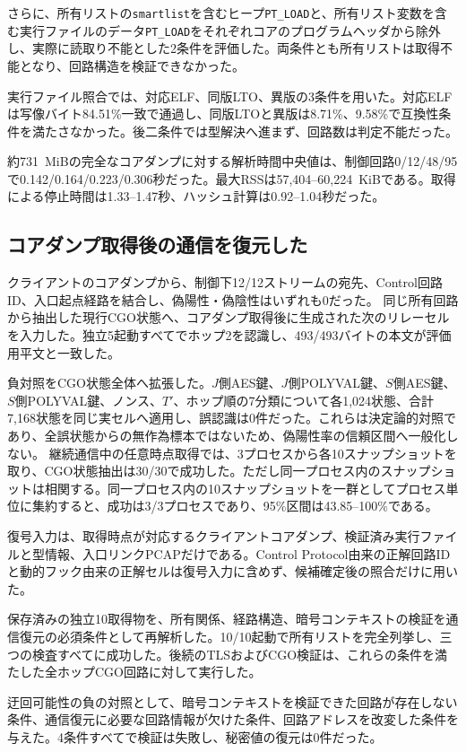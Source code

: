 \documentclass[10pt,a4paper]{ltjsarticle}
\newcommand{\code}[1]{\nolinkurl{#1}}
\begin{document}
さらに、所有リストの\code{smartlist}を含むヒープ\code{PT_LOAD}と、所有リスト変数を含む実行ファイルのデータ\code{PT_LOAD}をそれぞれコアのプログラムヘッダから除外し、実際に読取り不能とした2条件を評価した。両条件とも所有リストは取得不能となり、回路構造を検証できなかった。

実行ファイル照合では、対応ELF、同版LTO、異版の3条件を用いた。対応ELFは写像バイト84.51\%一致で通過し、同版LTOと異版は8.71\%、9.58\%で互換性条件を満たさなかった。後二条件では型解決へ進まず、回路数は判定不能だった。

約731~MiBの完全なコアダンプに対する解析時間中央値は、制御回路0/12/48/95で0.142/0.164/0.223/0.306秒だった。最大RSSは57,404--60,224~KiBである。取得による停止時間は1.33--1.47秒、ハッシュ計算は0.92--1.04秒だった。

\subsection{コアダンプ取得後の通信を復元した}

クライアントのコアダンプから、制御下12/12ストリームの宛先、Control回路ID、入口起点経路を結合し、偽陽性・偽陰性はいずれも0だった。
同じ所有回路から抽出した現行CGO状態へ、コアダンプ取得後に生成された次のリレーセルを入力した。独立5起動すべてでホップ2を認識し、493/493バイトの本文が評価用平文と一致した。

負対照をCGO状態全体へ拡張した。$J$側AES鍵、$J$側POLYVAL鍵、$S$側AES鍵、$S$側POLYVAL鍵、ノンス、$T'$、ホップ順の7分類について各1,024状態、合計7,168状態を同じ実セルへ適用し、誤認識は0件だった。これらは決定論的対照であり、全誤状態からの無作為標本ではないため、偽陽性率の信頼区間へ一般化しない。
継続通信中の任意時点取得では、3プロセスから各10スナップショットを取り、CGO状態抽出は30/30で成功した。ただし同一プロセス内のスナップショットは相関する。同一プロセス内の10スナップショットを一群としてプロセス単位に集約すると、成功は3/3プロセスであり、95\%区間は43.85--100\%である。


復号入力は、取得時点が対応するクライアントコアダンプ、検証済み実行ファイルと型情報、入口リンクPCAPだけである。Control Protocol由来の正解回路IDと動的フック由来の正解セルは復号入力に含めず、候補確定後の照合だけに用いた。

保存済みの独立10取得物を、所有関係、経路構造、暗号コンテキストの検証を通信復元の必須条件として再解析した。10/10起動で所有リストを完全列挙し、三つの検査すべてに成功した。後続のTLSおよびCGO検証は、これらの条件を満たした全ホップCGO回路に対して実行した。

迂回可能性の負の対照として、暗号コンテキストを検証できた回路が存在しない条件、通信復元に必要な回路情報が欠けた条件、回路アドレスを改変した条件を与えた。4条件すべてで検証は失敗し、秘密値の復元は0件だった。
\end{document}
